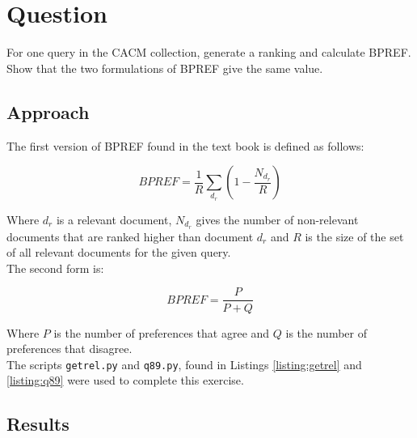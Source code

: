 \section{Question}
For one query in the CACM collection, generate a ranking and calculate BPREF. Show that the two formulations of BPREF give the same value.

\subsection{Approach}
The first version of BPREF found in the text book is defined as follows:

\begin{equation}
\nonumber
BPREF = \frac{1}{R} \sum_{d_r}(1 - \frac{N_{d_r}}{R})
\end{equation}

Where \(d_r\) is a relevant document, \(N_{d_r}\) gives the number of non-relevant documents that are ranked higher than document \(d_r\) and \(R\) is the size of the set of all relevant documents for the given query.\\

The second form is:

\begin{equation}
\nonumber
BPREF = \frac{P}{P + Q}
\end{equation}


Where \(P\) is the number of preferences that agree and \(Q\) is the number of preferences that disagree.\\

The scripts \texttt{getrel.py} and \texttt{q89.py}, found in Listings \ref{listing:getrel} and \ref{listing:q89} were used to complete this exercise.

\subsection{Results}
